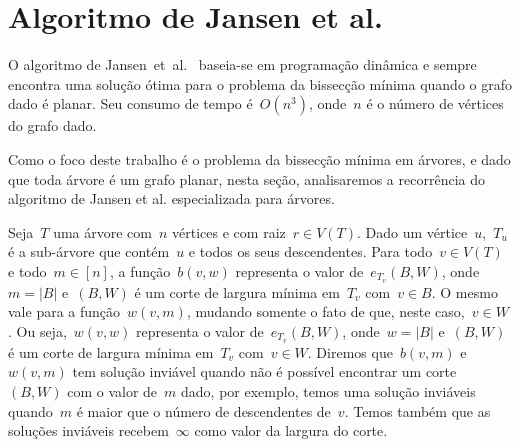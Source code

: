 \section {Algoritmo de Jansen et al.}

O algoritmo de Jansen~et~al.~\cite{JansenKLS01} baseia-se 
em programação dinâmica e sempre encontra
uma solução ótima para o problema da bissecção
mínima quando o grafo dado é planar.
Seu consumo de tempo é~$O(n^3)$, onde~$n$ é
o número de vértices do grafo dado.

Como o foco deste trabalho é o problema da 
bissecção mínima em árvores, e dado
que toda árvore é um grafo
planar, nesta seção, analisaremos a 
recorrência do algoritmo de Jansen et al.
especializada para árvores. 

\bigskip
\bigskip


Seja~$T$ uma árvore com~$n$ vértices e com raiz~$r\in V(T)$.
Dado um vértice~$u$,~$T_u$ é a sub-árvore que contém~$u$
e todos os seus descendentes. 
Para todo~${v\in V(T)}$ e todo~${m\in[n]}$,
a função~$b(v,w)$ representa o valor
de~$e_{T_v}(B,W)$, onde~${m=|B|}$
e~$(B,W)$ é um corte de largura mínima em~$T_v$ com~${v\in B}$.
O mesmo vale para a função~$w(v,m)$, mudando somente
o fato de que, neste caso,~${v\in W}$.
Ou seja,~$w(v,w)$ representa o valor
de~$e_{T_v}(B,W)$, onde~${w=|B|}$
e~$(B,W)$ é um corte de largura mínima em~$T_v$ com~${v\in W}$.
Diremos que~$b(v,m)$ e~$w(v,m)$ tem solução inviável quando
não é possível encontrar um corte~$(B,W)$ com o valor de~$m$ dado,
por exemplo, temos uma solução inviáveis
quando~$m$ é maior que o número de descendentes de~$v$.
Temos também que as soluções inviáveis recebem~$\infty$
como valor da largura do corte.

